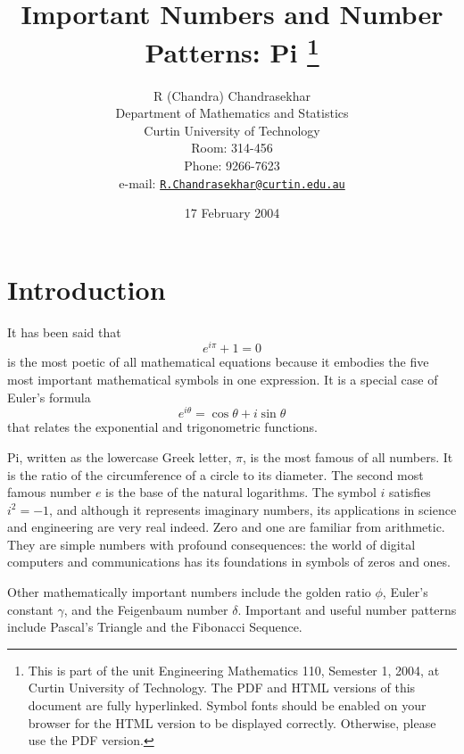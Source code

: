 \documentclass[11pt,a4paper,onecolumn]{article}
\begin{document}
%

%
\title{Important Numbers and Number Patterns: Pi%
\thanks{This is part of the unit Engineering Mathematics 110, Semester 1, 2004,  at Curtin University of Technology.  The PDF and HTML versions of this document are fully hyperlinked.  Symbol fonts should be enabled on your browser for the HTML version to be displayed correctly.  Otherwise, please use the PDF version.}}
\author{R (Chandra) Chandrasekhar\\
Department of Mathematics and Statistics\\
Curtin University of Technology\\
Room: 314-456\\
Phone: 9266-7623\\
e-mail: \href{mailto:R.Chandrasekhar@curtin.edu.au}%
{\texttt{R.Chandrasekhar@curtin.edu.au}}}
\date{17 February 2004}
%
\maketitle
%
\section{Introduction}

It has been said that%
%
\begin{equation} 
e^{i\pi} + 1 = 0 
\end{equation}
%
is the most poetic of all mathematical equations because it embodies
the five most important mathematical symbols in one expression.  It is a special case of Euler's formula%
%
\begin{equation}
e^{i\theta} = \cos\theta + i \sin\theta
\end{equation}
%
that relates the exponential and trigonometric functions.

Pi, written as the lowercase Greek letter, $\pi$, is the most famous of
all numbers.  It is the ratio of the circumference of a circle to its
diameter.  The second most famous number $e$ is the base of the natural
logarithms.  The symbol $i$ satisfies $i^2 = -1$, and although it
represents imaginary numbers, its applications in science and
engineering are very real indeed.  Zero and one are familiar from
arithmetic.  They are simple numbers with profound consequences: the
world of digital computers and communications has its foundations in
symbols of zeros and ones.

Other mathematically important numbers include the golden ratio $\phi$,
Euler's constant $\gamma$, and the Feigenbaum number $\delta$. 
Important and useful number patterns include Pascal's Triangle and the
Fibonacci Sequence.
\end{document}
